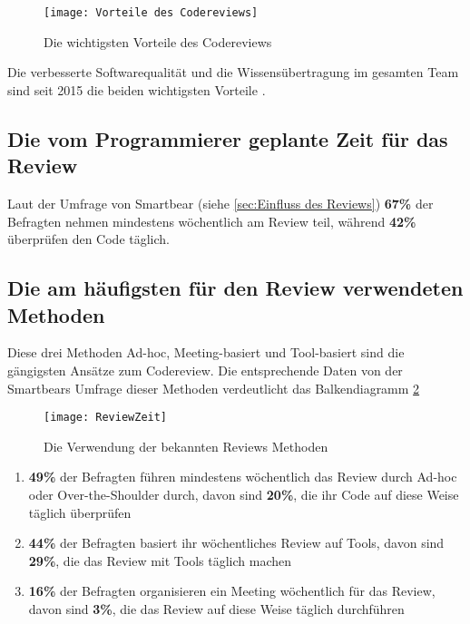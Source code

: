 \begin{figure}[H]
	\centering
	\texttt{[image: Vorteile des Codereviews]}
	\caption[Vorteile des Codereviews]{Die wichtigsten Vorteile des Codereviews\\ \cite{smartbear}}
	\label{fig:Vorteile des Codereviews}
\end{figure}

Die verbesserte Softwarequalität und die Wissensübertragung im gesamten Team sind seit 2015 die beiden wichtigsten Vorteile \cite{smartbear}.

\subsection{Die vom Programmierer geplante Zeit für das Review}
\label{subsec:reviewerZeit}

Laut der Umfrage von Smartbear (siehe \cref{sec:Einfluss des Reviews}) \textbf{67\%} der Befragten nehmen mindestens wöchentlich am Review teil, während \textbf{42\%} überprüfen den Code täglich.

\subsection{Die am häufigsten für den Review verwendeten Methoden}
\label{subsec:Die am häufigsten verwendete Methoden}

Diese drei Methoden Ad-hoc, Meeting-basiert und Tool-basiert sind die gängigsten Ansätze zum Codereview.
Die entsprechende Daten von der Smartbears Umfrage \cite{smartbear} dieser Methoden verdeutlicht das Balkendiagramm \cref{fig:ReviewZeit} 

\begin{figure}[H]
	\centering
	\texttt{[image: ReviewZeit]}
	\caption[Die Verwendung der bekannten Reviews Methoden]{Die Verwendung der bekannten Reviews Methoden\\\cite{smartbear}}
	\label{fig:ReviewZeit}
\end{figure}

\begin{enumerate}
	\item \textbf{49\%} der Befragten führen mindestens wöchentlich das Review durch Ad-hoc oder Over-the-Shoulder durch, davon sind \textbf{20\%}, die ihr Code auf diese Weise 					täglich überprüfen
	\item \textbf{44\%} der Befragten basiert ihr wöchentliches Review auf Tools, davon sind \textbf{29\%}, die das Review mit Tools täglich machen
	\item \textbf{16\%} der Befragten organisieren ein Meeting wöchentlich für das Review, davon sind \textbf{3\%}, die das Review auf diese Weise täglich durchführen
\end{enumerate}

